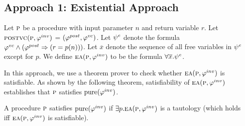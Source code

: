 

\subsection{Approach 1: Existential Approach}

Let $\textsc{p}$ be a procedure with input parameter $n$ and return variable $r$.
Let\\ $\textsc{postvc}({\textsc{p}},{\varphi^{inv}})$ = $(\varphi^{post},\varphi^{vc})$.
Let $\psi^e$ denote the formula $\varphi^{vc} \wedge (\varphi^{post} \Rightarrow (r = p(n)))$.
Let $\overline{x}$ denote the sequence of all free variables in $\psi^e$ except for $p$.
We define $\textsc{ea}(\textsc{p},\varphi^{inv})$ to be the formula $ \forall \overline{x}. \psi^e$.

In this approach, we use a theorem prover to check whether $\textsc{ea}(\textsc{p},\varphi^{inv})$ is satisfiable.
As shown by the following theorem, satisfiability of $\textsc{ea}(\textsc{p},\varphi^{inv})$ establishes that $\textsc{p}$
satisfies $\mathrm{pure}(\varphi^{inv})$.

\begin{theorem}
\label{theorem:EA}
A procedure $\textsc{p}$ satisfies $\mathrm{pure}(\varphi^{inv})$ if
$\exists p. \textsc{ea}(\textsc{p},\varphi^{inv})$ is a tautology
(which holds iff $\textsc{ea}(\textsc{p},\varphi^{inv})$ is satisfiable).
\end{theorem}

